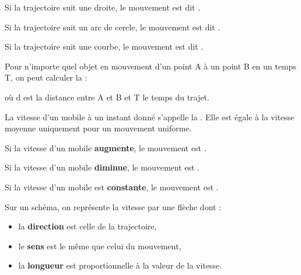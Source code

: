 \documentclass[11pt,a4paper]{article}
\begin{document}
Si la trajectoire suit une droite, le mouvement est dit . 


Si la trajectoire suit un arc de cercle, le mouvement est dit .


Si la trajectoire suit une courbe, le mouvement est dit .


\newpage


Pour n’importe quel objet en mouvement d’un point A à un point B en un temps T, on peut calculer la :

 où d est la distance entre A et B et T le temps du trajet.

La vitesse d’un mobile à un instant donné s’appelle la . Elle est égale à la vitesse moyenne uniquement pour un mouvement uniforme.



Si la vitesse d’un mobile \textbf{augmente}, le mouvement est .

Si la vitesse d’un mobile \textbf{diminue}, le mouvement est .

Si la vitesse d’un mobile est \textbf{constante}, le mouvement est .


Sur un schéma, on représente la vitesse par une flèche dont :

\begin{itemize}
    \item la \textbf{direction} est celle de la trajectoire,
    \item le \textbf{sens} est le même que celui du mouvement,
    \item la \textbf{longueur} est proportionnelle à la valeur de la vitesse.
\end{itemize}
\end{document}
